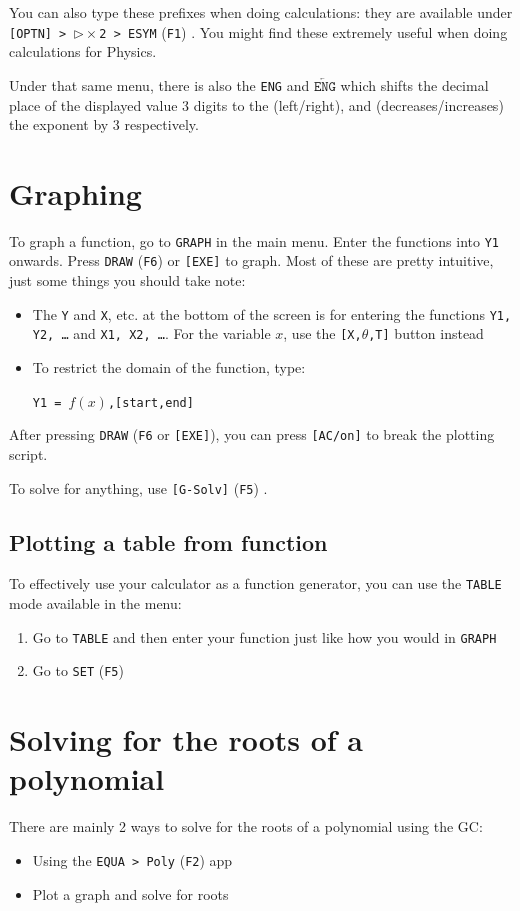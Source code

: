 \documentclass[a5paper,draft]{memoir}
\def\code#1{\texttt{#1}}
\def\Fone{(\code{F1}) }
\def\Ftwo{(\code{F2}) }
\def\Ffive{(\code{F5}) }
\def\Fsix{(\code{F6}) }
\begin{document}
You can also type these prefixes when doing calculations: they are available under \code{[OPTN] > $\triangleright\times$2 > ESYM} \Fone. You might find these extremely useful when doing calculations for Physics.

Under that same menu, there is also the \code{ENG} and $\overleftarrow{\texttt{ENG}}$ which shifts the decimal place of the displayed value 3 digits to the (left/right), and (decreases/increases) the exponent by 3 respectively.

\section{Graphing} \label{graphing}
To graph a function, go to \code{GRAPH} in the main menu. Enter the functions into \code{Y1} onwards. Press \code{DRAW} \Fsix or \code{[EXE]} to graph. Most of these are pretty intuitive, just some things you should take note:
\begin{itemize}
	\item The \code{Y} and \code{X}, etc. at the bottom of the screen is for entering the functions \code{Y1, Y2, \dots} and \code{X1, X2, \dots}. For the variable $x$, use the \code{[X,$\theta$,T]} button instead
	\item To restrict the domain of the function, type:
	\begin{center}
		\code{Y1 = $f(x)$,[start,end]}
	\end{center}
\end{itemize}

After pressing \code{DRAW} (\code{F6} or \code{[EXE]}), you can press \code{[AC/on]} to break the plotting script.

To solve for anything, use \code{[G-Solv]} \Ffive.

\subsection{Plotting a table from function} \label{plottable}
To effectively use your calculator as a function generator, you can use the \code{TABLE} mode available in the menu:
\begin{enumerate}
	\item Go to \code{TABLE} and then enter your function just like how you would in \code{GRAPH}
	\item Go to \code{SET} \Ffive
\end{enumerate}

\section{Solving for the roots of a polynomial}
There are mainly 2 ways to solve for the roots of a polynomial using the GC:
\begin{itemize}
	\item Using the \code{EQUA > Poly} \Ftwo app
	\item Plot a graph and solve for roots
\end{itemize}
\end{document}
